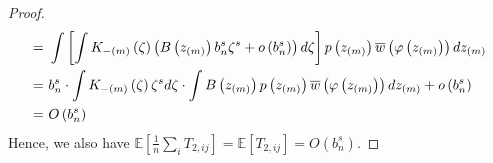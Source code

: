 \documentclass[12pt,american]{article}
\theoremstyle{definition}
\theoremstyle{plain}
\theoremstyle{definition}
\theoremstyle{plain}
\theoremstyle{plain}
\theoremstyle{plain}
\theoremstyle{plain}
\theoremstyle{plain}
\newcommand{\E}{\mathbb{E}}
\begin{document}
\begin{proof}
\begin{align*}
=\  & \int\left[\int K_{-\left(m\right)}\left(\zeta\right)\left(B\left(z_{\left(m\right)}\right)b_{n}^{s}\zeta^{s}+o\left(b_{n}^{s}\right)\right)d\zeta\right]p\left(z_{\left(m\right)}\right)\overline{w}\left(\varphi\left(z_{\left(m\right)}\right)\right)dz_{\left(m\right)}\\
=\  & b_{n}^{s}\cdot\int K_{-\left(m\right)}\left(\zeta\right)\zeta^{s}d\zeta\cdot\int B\left(z_{\left(m\right)}\right)p\left(z_{\left(m\right)}\right)\overline{w}\left(\varphi\left(z_{\left(m\right)}\right)\right)dz_{\left(m\right)}+o\left(b_{n}^{s}\right)\\
=\  & O\left(b_{n}^{s}\right)
\end{align*}
Hence, we also have $\E\left[\frac{1}{n}\sum_{i}T_{2,ij}\right] =  \E\left[T_{2,ij}\right]=O\left(b_{n}^{s}\right)$.
\end{proof}
\end{document}

